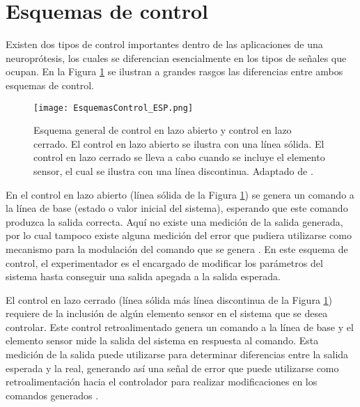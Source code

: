 \section{Esquemas de control}
Existen dos tipos de control importantes dentro de las aplicaciones de una neuroprótesis, los cuales se diferencian esencialmente en los tipos de señales que ocupan. En la Figura \ref{Figura: EsqCont} se ilustran a grandes rasgos las diferencias entre ambos esquemas de control.

\begin{figure}[htbp]
\centering
	\texttt{[image: EsquemasControl\_ESP.png]}
	\caption[Esquema general de control en lazo abierto y control en lazo cerrado]{Esquema general de control en lazo abierto y control en lazo cerrado. El control en lazo abierto se ilustra con una línea sólida. El control en lazo cerrado se lleva a cabo cuando se incluye el elemento sensor, el cual se ilustra con una línea discontinua. Adaptado de \cite{Wright2016}.}
	\label{Figura: EsqCont}
\end{figure}

En el control en lazo abierto (línea sólida de la Figura \ref{Figura: EsqCont}) se genera un comando a la línea de base (estado o valor inicial del sistema), esperando que este comando produzca la salida correcta. Aquí no existe una medición de la salida generada, por lo cual tampoco existe alguna medición del error que pudiera utilizarse como mecanismo para la modulación del comando que se genera \cite{Wright2016}. En este esquema de control, el experimentador es el encargado de modificar los parámetros del sistema hasta conseguir una salida apegada a la salida esperada.

El control en lazo cerrado (línea sólida más línea discontinua de la Figura \ref{Figura: EsqCont}) requiere de la inclusión de algún elemento sensor en el sistema que se desea controlar. Este control retroalimentado genera un comando a la línea de base y el elemento sensor mide la salida del sistema en respuesta al comando. Esta medición de la salida puede utilizarse para determinar diferencias entre la salida esperada y la real, generando así una señal de error que puede utilizarse como retroalimentación hacia el controlador para realizar modificaciones en los comandos generados \cite{Wright2016}.


